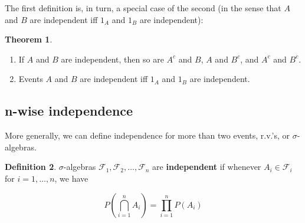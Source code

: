 \documentclass{article}
\theoremstyle{definition}
\newtheorem{theorem}{Theorem}[section]
\newtheorem{definition}[theorem]{Definition}
\begin{document}

The first definition is, in turn, a special case of the second (in the sense that $A$ and $B$ are independent iff $1_A$ and $1_B$ are independent):

\begin{theorem}
    \begin{enumerate}
        \item If $A$ and $B$ are independent, then so are $A^c$ and $B$, $A$ and $B^c$, and $A^c$ and $B^c$.
        \item Events $A$ and $B$ are independent iff $1_A$ and $1_B$ are independent.
    \end{enumerate}
\end{theorem}

\subsection{n-wise independence}

More generally, we can define independence for more than two events, r.v.'s, or $\sigma$-algebras.

\begin{definition}
    $\sigma$-algebras $\mathcal{F}_1, \mathcal{F}_2, \ldots, \mathcal{F}_n$ are \textbf{independent} if whenever $A_i \in \mathcal{F}_i$ for $i = 1, \ldots, n$, we have

    \[
        P\left(\bigcap_{i=1}^n A_i\right) = \prod_{i=1}^n P(A_i)
    \]

\end{definition}
\end{document}
